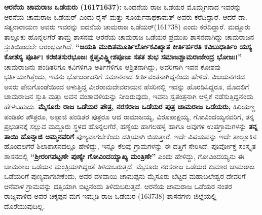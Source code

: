 \textbf{ ಆರನೆಯ ಚಾಮರಾಜ ಒಡೆಯರು (1617\general{\enginline{-}}1637): } ಒಂದನೆಯ ರಾಜ ಒಡೆಯರ ಮೊಮ್ಮಗನಾದ ಇವರನ್ನು ಆರನೆಯ ಚಾಮರಾಜ ಒಡೆಯರ್​ ಎಂದು ರೈಸ್​ ಮತ್ತು ಸೂರ್ಯನಾಥಕಾಮತ್​ ಅವರು ಕರೆದಿದ್ದಾರೆ. ಆದರೆ ಡಾ. ಸತ್ಯನಾರಾಯಣ ಅವರು ಇವರನ್ನು ಐದನೆಯ ಚಾಮರಾಜ ಒಡೆಯರ್​(1617\enginline{-}38) ಎಂದು ಕರೆದಿದ್ದಾರೆ. ಮದ್ದೂರು ತಾಲ್ಲೂಕು ಹೊನ್ನಲಗೆರೆ ತಾಮ್ರ ಶಾಸನವು ಆರನೆಯ ಚಾಮರಾಜ ಒಡೆಯರ ಪ್ರಮುಖ ಶಾಸನವಾಗಿದ್ದು ಚಾಮರಾಜನ ಸ್ತುತಿಯಿಂದಲೇ ಆರಂಭವಾಗಿದೆ. \textbf{“ಜಯತಿ ಮುದಿತಮೂರ್ತಿರ್ಲೋಕವಿಖ್ಯಾತ ಕೀರ್ತಿರ್ಹರತಿ ಕವಿಬುಧಾರ್ತಿಂ ಯಸ್ಯ ಕೋಶಸ್ಯ ಪೂರ್ತಿ। ಕರಜಿತಸುರಭೂಜಃ ಕ್ಲಪ್ತವಿಷ್ಣ್ವೀಶಪೂಜಃ ಸತತ ಶುಭ ಸಮಾಜಶ್ಚಾಮರಾಜೇಂದ್ರ ಭೋಜಃ।”} ಚಾಮರಾಜನು ಪಂಡಿತರಿಗೂ ಕವಿಗಳಿಗೂ ಅರ್ತಿಗಳಿಗೂ ಆಶ್ರಿತನಾಗಿದ್ದು, ಅವರಿಗಾಗಿ ಇವನ ಕೋಶವು ಭರ್ತಿಯಾಗಿತ್ತೆಂದು, ಇವನು ಭೋಜರಾಜನಿಗೆ ಸಮಾನನಾದ ಕೀರ್ತಿವಂತನಾಗಿದ್ದನೆಂದು ಹೇಳಿದೆ. ವಿಜಯನಗರದ ಅಸರು ಪೆನುಗೊಂಡೆಯಿಂದ ಆಳುತ್ತಿದ್ದ ವೀರರಾಮದೇವರಾಯನ ಹೆಸರಿನಲ್ಲಿ ಇದನ್ನು ಹೊರಡಿಸಿದ್ದರೂ, ಮೊದಲಿಗೆ ಚಾಮರಾಜನ ಸ್ತುತಿ ಮತ್ತು ಅವನ ವಂಶಾವಳಿಯನ್ನು ನೀಡಿರುವುದು, ಇವನು ಸ್ವತಂತ್ರನಾಗಿ ಆಳ್ವಿಕೆ ನಡೆಸುತ್ತಿದ್ದನೆಂದು ಹೇಳಬಹುದು. \textbf{ಮೈಸೂರು ರಾಜ ಒಡೆಯರ ಪೌತ್ರ, ನರಸರಾಜ ಒಡೆಯರ ಪುತ್ರ ಚಾಮರಾಜ ಒಡೆಯರು,} ಹಿರಿಯಣ್ಣ ಪಂಡಿತರ ಪೌತ್ರರೂ, ಅಪ್ಪಾಜಿ ಪಂಡಿತರ ಪುತ್ರರೂ ಆದ ರಾಮಾಜಯ್ಯ, ವಿರೂಪಾಕ್ಷಯ್ಯ, ಗೋವಿಂದಯ್ಯನವರಿಗೆ, ತನ್ನ ಪ್ರಭುತನಕ್ಕೆ ಸಲ್ಲುವ ಮದ್ದೂರು ಸ್ಥಳದ ಹೊನ್ನಲಗೆರೆ, ಹಣ್ನೆಯ ಹಾಗಲಹಳ್ಳಿ ಹಾಗೂ ಅವುಗಳ ಉಪಗ್ರಾಮಗಳನ್ನು \textbf{ತನ್ನ ತಾಯಿ ಹೊನ್ನಾಜಿ ಅಮ್ಮನವರಿಗೆ} ಪುಣ್ಯವಾಗಬೇಕೆಂದು ದತ್ತಿಯಾಗಿ ಬಿಡುತ್ತಾರೆ. ಇದೇ ವಿಷಯವನ್ನು ಇದೇ ತಾಲ್ಲೂಕಿನ ಹೊಂದಲಗೆರೆ ಶಿಲಾಶಾಸನದಲ್ಲೂ ಹೇಳಿದ್ದು, ಇನ್ನೂ ಕೆಲವು ಗ್ರಾಮಗಳನ್ನು ಈ ದತ್ತಿಗೆ ಸೇರಿಸಿದೆ. ಪೂರ್ವೋಕ್ತ ಸಂಸ್ಕೃತ ಶಾಸನದಲ್ಲಿ \textbf{“ಶ‍್ರೀರಂಗಪಟ್ಟಣೇ ಪುಣ್ಯೇ ಗೋವಿಂದಯ್ಯಾಖ್ಯ ಮಂತ್ರಿಣೇ”} ಎಂದು ಹೇಳಿದ್ದು, ಗೋವಿಂದಯ್ಯನು ಈ ಚಾಮರಾಜ ಒಡೆಯನ ಮಂತ್ರಿಯಾಗಿದ್ದಂತೆ ತಿಳಿದುಬರುತ್ತದೆ. ಮೈಸೂರು ನರಸರಾಜ ಒಡೆಯರ ಕುಮಾರ ಚಾಮರಾಜ ಒಡೆಯರಿಗೆ ಪುಣ್ಯವಾಗಬೇಕೆಂದು, ಅವರ ದಳವಾಯಿ ಚಾಮಪ್ಪನು ಮೈಸೂರು ಬೆಟ್ಟದ ಮಹಾಬಲೇಶ್ವರ ದೇವರಿಗೆ ಆನೆವಾಳ ಗ್ರಾಮವನ್ನು ದತ್ತಿಯಾಗಿ ಬಿಟ್ಟನೆಂದು ತಿಳಿದುಬರುತ್ತದೆ. ಆರನೆಯ ಚಾಮರಾಜ ಒಡೆಯರ ನಂತರ ರಾಜ್ಯವಾಳಿದ ಅವರ ಚಿಕ್ಕಪ್ಪನ ಮಗ ಇಮ್ಮಡಿ ರಾಜ ಒಡೆಯರ (1637\enginline{-}38) ಶಾಸನಗಳು ಜಿಲ್ಲೆಯಲ್ಲಿ ದೊರೆಯುವುದಿಲ್ಲ.

\newpage

